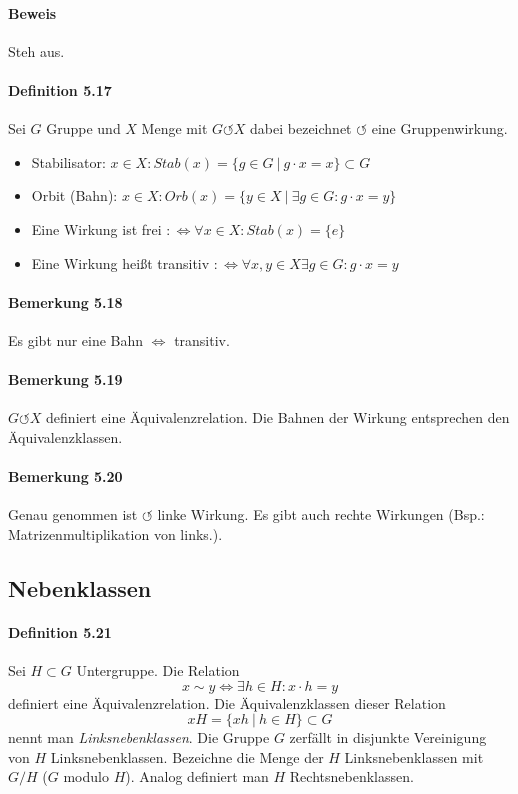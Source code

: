 \documentclass{scrartcl}
\begin{document}
\paragraph{Beweis} Steh aus.

\paragraph{Definition 5.17} Sei $G$ Gruppe und $X$ Menge mit $G \circlearrowleft
X$ dabei bezeichnet $\circlearrowleft$ eine Gruppenwirkung.
\begin{itemize}
\item Stabilisator: $x \in X: Stab(x) = \{g \in G ~|~ g \cdot x = x\}
  \subset G$
\item Orbit (Bahn): $x \in X: Orb(x) = \{y \in X ~|~ \exists g \in G: g \cdot x
  = y\}$
\item Eine Wirkung ist frei $:\Leftrightarrow \forall x \in X: Stab(x) = \{e\}$
\item Eine Wirkung heißt transitiv $:\Leftrightarrow \forall x,y \in X \exists g
  \in G: g \cdot x = y$
\end{itemize}

\paragraph{Bemerkung 5.18} Es gibt nur eine Bahn $\Leftrightarrow$ transitiv.
\paragraph{Bemerkung 5.19} $G \circlearrowleft X$ definiert eine
Äquivalenzrelation. Die Bahnen der Wirkung entsprechen den Äquivalenzklassen.
\paragraph{Bemerkung 5.20} Genau genommen ist $\circlearrowleft$ linke Wirkung.
Es gibt auch rechte Wirkungen (Bsp.: Matrizenmultiplikation von links.).

\subsection{Nebenklassen}
\label{subsec:nebenklassen}

\paragraph{Definition 5.21} Sei $H \subset G$ Untergruppe. Die Relation
\[
  x \sim y \Leftrightarrow \exists h \in H: x \cdot h = y
\]
definiert eine Äquivalenzrelation. Die Äquivalenzklassen dieser Relation
\[
  xH = \{xh ~|~ h \in H\} \subset G
\]
nennt man \textit{Linksnebenklassen}. Die Gruppe $G$ zerfällt in disjunkte
Vereinigung von $H$ Linksnebenklassen.
Bezeichne die Menge der $H$ Linksnebenklassen mit $G/H$ ($G$ modulo $H$).
Analog definiert man $H$ Rechtsnebenklassen.
\end{document}
